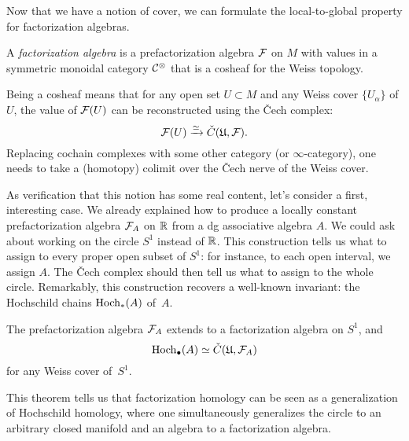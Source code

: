 \documentclass[11pt]{amsart}
\def\owen#1{{\textcolor{violet!65!black}{OG: {#1}}}}
\begin{document}
Now that we have a notion of cover, we can formulate the local-to-global property for factorization algebras.

\begin{dfn}
A \emph{factorization algebra} is a prefactorization algebra $\mathcal F$ on $M$ with values in a symmetric monoidal category $\mathcal C^\otimes$ that is a cosheaf for the Weiss topology.
\end{dfn}

Being a cosheaf means that for any open set $U \subset M$ and any Weiss cover $\{ U_\alpha\}$ of $U$,
the value of $\mathcal F(U)$ can be reconstructed using the \v{C}ech complex:
\[
\mathcal F(U) \xrightarrow{\simeq} \check{C}(\mathfrak{U},\mathcal F).
\]
Replacing cochain complexes with some other category (or $\infty$-category), one needs to take a (homotopy) colimit over the \v{C}ech nerve of the Weiss cover.

As verification that this notion has some real content, let's consider a first, interesting case.
We already explained how to produce a locally constant prefactorization algebra $\mathcal F_A$ on $\mathbb R$ from a dg associative algebra $A$.
We could ask about working on the circle $S^1$ instead of $\mathbb R$.
This construction tells us what to assign to every proper open subset of $S^1$: for instance, to each open interval, we assign $A$.
The \v{C}ech complex should then tell us what to assign to the whole circle.
Remarkably, this construction recovers a well-known invariant: the Hochschild chains ${\rm Hoch}_*(A)$ of~$A$.

\begin{thm}[\owen{citations}]
The prefactorization algebra $\mathcal F_A$ extends to a factorization algebra on $S^1$, and
\[
{\rm Hoch}_\bullet(A) \simeq \check{C}(\mathfrak{U},\mathcal F_A)
\]
for any Weiss cover of~$S^1$.
\end{thm}

This theorem tells us that factorization homology can be seen as a generalization of Hochschild homology,
where one simultaneously generalizes the circle to an arbitrary closed manifold and an algebra to a factorization algebra.

%
\end{document}
